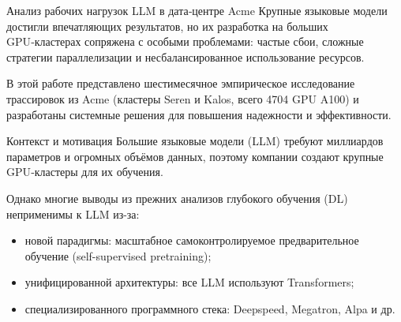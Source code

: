\begin{frame}{Анализ рабочих нагрузок LLM в дата‑центре Acme}
	Крупные языковые модели достигли впечатляющих результатов, 
	но их разработка на больших GPU‑кластерах сопряжена с особыми проблемами:
	частые сбои, сложные стратегии параллелизации и несбалансированное использование ресурсов.
	
	В этой работе представлено шестимесячное эмпирическое исследование трассировок из Acme 
	(кластеры Seren и Kalos, всего 4704 GPU A100) и разработаны системные решения 
	для повышения надежности и эффективности.
\end{frame}

\begin{frame}{Контекст и мотивация}
	Большие языковые модели (LLM) требуют миллиардов параметров и огромных объёмов данных, 
	поэтому компании создают крупные GPU‑кластеры для их обучения.
	
	Однако многие выводы из прежних анализов глубокого обучения (DL) неприменимы к LLM из-за:
	\begin{itemize}
		\item новой парадигмы: масштабное самоконтролируемое предварительное обучение (self-supervised pretraining);
		\item унифицированной архитектуры: все LLM используют Transformers;
		\item специализированного программного стека: Deepspeed, Megatron, Alpa и др.
	\end{itemize}
\end{frame}
